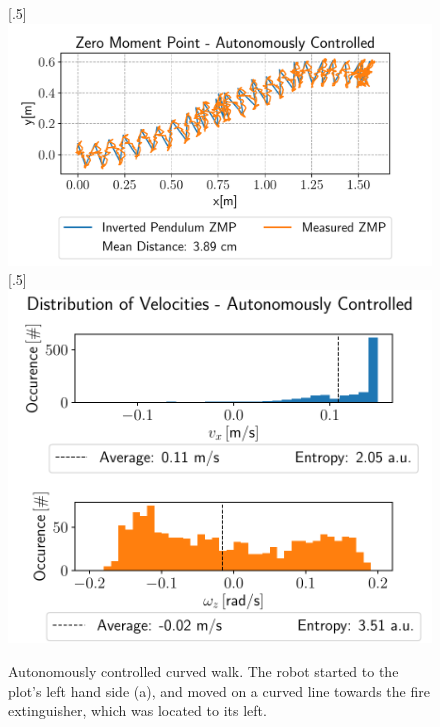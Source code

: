 \begin{figure}[h!]
	[.5\linewidth]{\includegraphics[scale=.45]{chapters/04_experiments/02_autonomous_walking/curved_walk_01_zmp.pdf}}
	[.5\linewidth]{\includegraphics[scale=.45]{chapters/04_experiments/02_autonomous_walking/curved_walk_01_entropy.pdf}}
	\caption{Autonomously controlled curved walk. The robot started to the plot's left hand side (a), and moved on a curved line towards the fire extinguisher, which was located to its left.}
\label{fig::424_aw_basic_curved}
\end{figure} 
